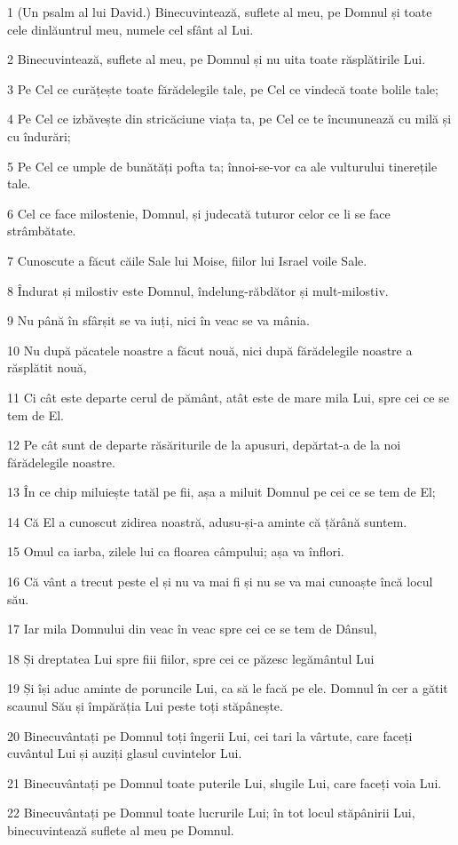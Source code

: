 \par 1 (Un psalm al lui David.) Binecuvintează, suflete al meu, pe Domnul și toate cele dinlăuntrul meu, numele cel sfânt al Lui.
\par 2 Binecuvintează, suflete al meu, pe Domnul și nu uita toate răsplătirile Lui.
\par 3 Pe Cel ce curățește toate fărădelegile tale, pe Cel ce vindecă toate bolile tale;
\par 4 Pe Cel ce izbăvește din stricăciune viața ta, pe Cel ce te încununează cu milă și cu îndurări;
\par 5 Pe Cel ce umple de bunătăți pofta ta; înnoi-se-vor ca ale vulturului tinerețile tale.
\par 6 Cel ce face milostenie, Domnul, și judecată tuturor celor ce li se face strâmbătate.
\par 7 Cunoscute a făcut căile Sale lui Moise, fiilor lui Israel voile Sale.
\par 8 Îndurat și milostiv este Domnul, îndelung-răbdător și mult-milostiv.
\par 9 Nu până în sfârșit se va iuți, nici în veac se va mânia.
\par 10 Nu după păcatele noastre a făcut nouă, nici după fărădelegile noastre a răsplătit nouă,
\par 11 Ci cât este departe cerul de pământ, atât este de mare mila Lui, spre cei ce se tem de El.
\par 12 Pe cât sunt de departe răsăriturile de la apusuri, depărtat-a de la noi fărădelegile noastre.
\par 13 În ce chip miluiește tatăl pe fii, așa a miluit Domnul pe cei ce se tem de El;
\par 14 Că El a cunoscut zidirea noastră, adusu-și-a aminte că țărână suntem.
\par 15 Omul ca iarba, zilele lui ca floarea câmpului; așa va înflori.
\par 16 Că vânt a trecut peste el și nu va mai fi și nu se va mai cunoaște încă locul său.
\par 17 Iar mila Domnului din veac în veac spre cei ce se tem de Dânsul,
\par 18 Și dreptatea Lui spre fiii fiilor, spre cei ce păzesc legământul Lui
\par 19 Și își aduc aminte de poruncile Lui, ca să le facă pe ele. Domnul în cer a gătit scaunul Său și împărăția Lui peste toți stăpânește.
\par 20 Binecuvântați pe Domnul toți îngerii Lui, cei tari la vârtute, care faceți cuvântul Lui și auziți glasul cuvintelor Lui.
\par 21 Binecuvântați pe Domnul toate puterile Lui, slugile Lui, care faceți voia Lui.
\par 22 Binecuvântați pe Domnul toate lucrurile Lui; în tot locul stăpânirii Lui, binecuvintează suflete al meu pe Domnul.

